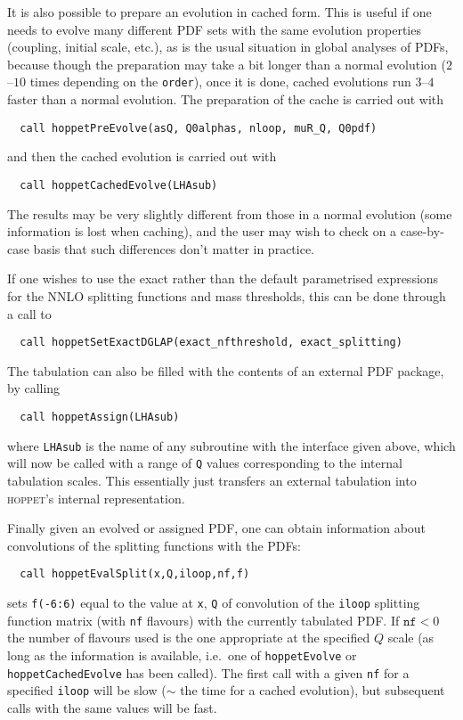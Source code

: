 \documentclass[12pt]{article}
\newcommand{\ie}{i.e.\ }
\newcommand{\hoppet}{\textsc{hoppet}\xspace}
\newcommand{\ttt}[1]{\texttt{#1}}
\begin{document}
It is also possible to prepare an evolution in cached form. This is
useful if one needs to evolve many different PDF sets with the same
evolution properties (coupling, initial scale, etc.), as is the
usual situation in global analyses of PDFs, because though
the preparation may take a bit longer than a normal evolution
($2$--$10$ times depending on the \ttt{order}), once it is done,
cached evolutions run $3$--$4$ faster than a normal evolution. The
preparation of the cache is carried out with
\begin{lstlisting}
  call hoppetPreEvolve(asQ, Q0alphas, nloop, muR_Q, Q0pdf)
\end{lstlisting}
and then the cached evolution is carried out with 
\begin{lstlisting}
  call hoppetCachedEvolve(LHAsub)
\end{lstlisting}
The results may be very slightly different from those in a normal
evolution (some information is lost when caching), and the user 
may wish to check on a case-by-case basis that such differences
don't matter in practice.

If one wishes to use the exact rather than the default parametrised
expressions for the NNLO splitting functions and mass thresholds, this
can be done through a call to
\begin{lstlisting}
  call hoppetSetExactDGLAP(exact_nfthreshold, exact_splitting)
\end{lstlisting}

The tabulation can also be filled with the contents of an external PDF
package, by calling
\begin{lstlisting}
  call hoppetAssign(LHAsub)
\end{lstlisting}
where \ttt{LHAsub} is the name of any subroutine with the interface
given above, which will now be called with a range of \ttt{Q} values
corresponding to the internal tabulation scales. This essentially just
transfers an external tabulation into \hoppet's internal
representation. 

Finally given an evolved or assigned PDF, one can obtain information
about convolutions of the splitting functions with the PDFs:
\begin{lstlisting}
  call hoppetEvalSplit(x,Q,iloop,nf,f)
\end{lstlisting}
sets \ttt{f(-6:6)} equal to the value at \ttt{x}, \ttt{Q} of
convolution of the \ttt{iloop} splitting function matrix (with
\ttt{nf} flavours) with the currently tabulated PDF. If $\ttt{nf}<0$
the number of flavours used is the one appropriate at the specified
$Q$ scale (as long as the information is available, \ie one of
\ttt{hoppetEvolve} or \ttt{hoppetCachedEvolve} has been called). The
first call with a given \ttt{nf} for a specified \ttt{iloop} will be
slow ($\sim$ the time for a cached evolution), but subsequent calls
with the same values will be fast.
\end{document}
